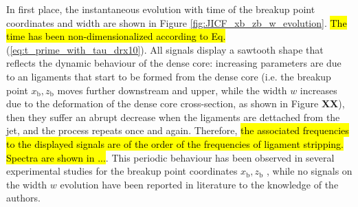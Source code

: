 In first place, the instantaneous evolution with time of the breakup point coordinates and width are shown in Figure \ref{fig:JICF_xb_zb_w_evolution}. \hl{The time has been non-dimensionalized according to Eq.} (\ref{eq:t_prime_with_tau_drx10}). All signals display a sawtooth shape that reflects the dynamic behaviour of the dense core: increasing parameters are due to an ligaments that start to be formed from the dense core (i.e. the breakup point $x_\mathrm{b}, z_\mathrm{b}$ moves further downstream and upper, while the width $w$ increases due to the deformation of the dense core cross-section, as shown in Figure \textbf{XX}), then they suffer an abrupt decrease when the ligaments are dettached from the jet, and the process repeats once and again. Therefore, \hl{the associated frequencies to the displayed signals are of the order of the frequencies of ligament stripping. Spectra are shown in ...}.  This periodic behaviour has been observed in several experimental studies for the breakup point coordinates $x_\mathrm{b}, z_\mathrm{b}$ , while no signals on the width $w$ evolution have been reported in literature to the knowledge of the authors.


